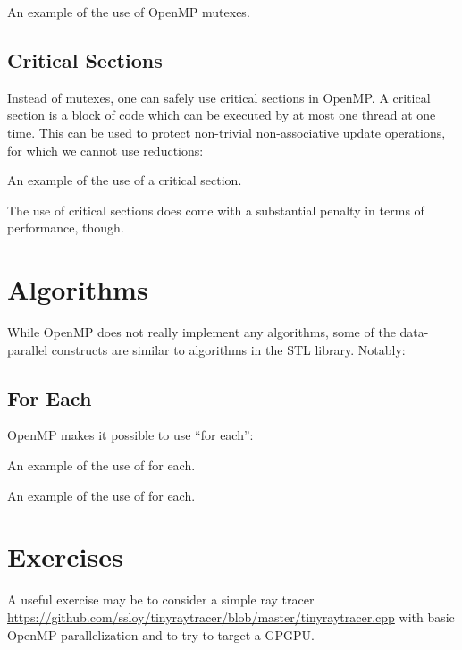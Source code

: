 \raggedbottom
\begin{codebox}[]{\href{https://godbolt.org/z/vnsW7v35z}{\ExternalLink}}
\footnotesize An example of the use of OpenMP mutexes.
\tcblower
{}
\end{codebox}

\subsection{Critical Sections}

Instead of mutexes, one can safely use critical sections in OpenMP. 
A critical section is a block of code which can be executed by at most 
one thread at one time.
This can be used to protect non-trivial non-associative update operations, 
for which we cannot use reductions: 

\raggedbottom
\begin{codebox}[]{\href{https://godbolt.org/z/YYeqYEdv3}{\ExternalLink}}
\footnotesize An example of the use of a critical section.
\tcblower
{}
\end{codebox}

The use of critical sections does come with a substantial penalty in terms of performance, though. 

\section{Algorithms}

While OpenMP does not really implement any algorithms, some of the data-parallel constructs are similar to algorithms in the STL library. Notably:

\subsection{For Each}

OpenMP makes it possible to use ``for each'':

\raggedbottom
\begin{codebox}[]{\href{https://godbolt.org/z/}{\ExternalLink}}
\footnotesize An example of the use of for each.
\tcblower
{}
\end{codebox}

\raggedbottom
\begin{codebox}[]{\href{https://godbolt.org/z/enK6dYEoW}{\ExternalLink}}
\footnotesize An example of the use of for each.
\tcblower
{}
\end{codebox}

\section{Exercises}
\label{sec:}

A useful exercise may be to consider a simple ray tracer \url{https://github.com/ssloy/tinyraytracer/blob/master/tinyraytracer.cpp} with basic OpenMP parallelization and to try to target a GPGPU. 



